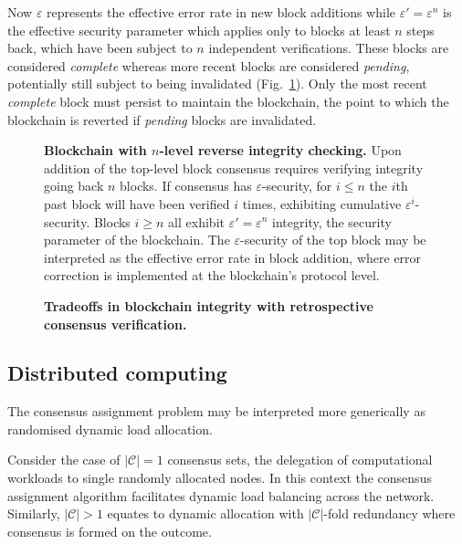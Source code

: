 Now $\varepsilon$ represents the effective error rate in new block additions while \mbox{$\varepsilon'=\varepsilon^n$} is the effective security parameter which applies only to blocks at least $n$ steps back, which have been subject to $n$ independent verifications. These blocks are considered \emph{complete} whereas more recent blocks are considered \emph{pending}, potentially still subject to being invalidated (Fig.~\ref{fig:backward_integrity}). Only the most recent \emph{complete} block must persist to maintain the blockchain, the point to which the blockchain is reverted if \emph{pending} blocks are invalidated.

\begin{figure}[!htb]
	
	\caption{\textbf{Blockchain with $n$-level reverse integrity checking.} Upon addition of the top-level block consensus requires verifying integrity going back $n$ blocks. If consensus has $\varepsilon$-security, for $i\leq n$ the $i$th past block will have been verified $i$ times, exhibiting cumulative $\varepsilon^i$-security. Blocks $i\geq n$ all exhibit $\varepsilon'=\varepsilon^n$ integrity, the security parameter of the blockchain. The $\varepsilon$-security of the top block may be interpreted as the effective error rate in block addition, where error correction is implemented at the blockchain's protocol level.} \label{fig:backward_integrity}
\end{figure}

\begin{figure}[!htb]
	\centering
	
	\caption{\textbf{Tradeoffs in blockchain integrity with retrospective consensus verification.}}\label{fig:blockchain_security_tradeoff}
\end{figure}

\subsection{Distributed computing}

The consensus assignment problem may be interpreted more generically as randomised dynamic load allocation.

Consider the case of $|\mathcal{C}|=1$ consensus sets, the delegation of computational workloads to single randomly allocated nodes. In this context the consensus assignment algorithm facilitates dynamic load balancing across the network. Similarly, \mbox{$|\mathcal{C}|>1$} equates to dynamic allocation with $|\mathcal{C}|$-fold redundancy where consensus is formed on the outcome.

